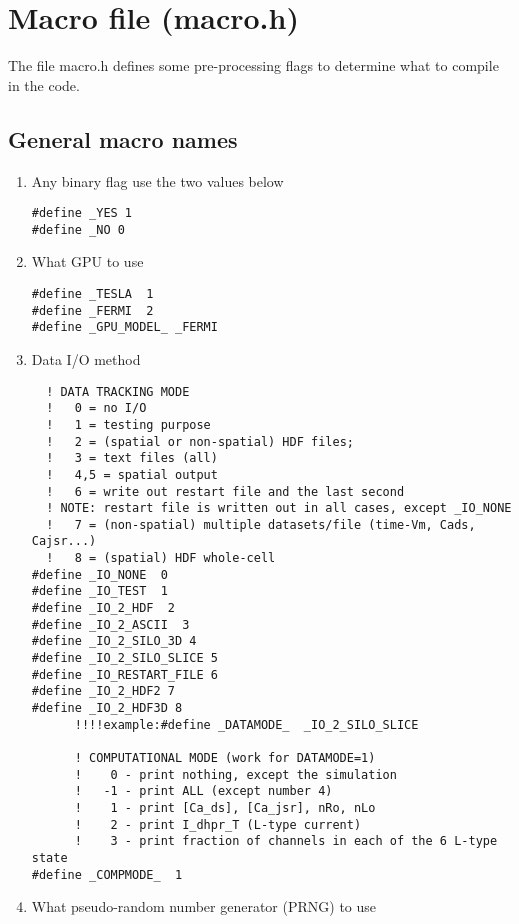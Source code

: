 \chapter{Macro file (macro.h)}

The file macro.h defines some pre-processing flags to determine what to compile
in the code. 

\section{General macro names}

\begin{enumerate}
  \item Any binary flag use the two values below

\begin{verbatim}
#define _YES 1
#define _NO 0 
\end{verbatim}

\item What GPU to use
\begin{verbatim}
#define _TESLA  1
#define _FERMI  2
#define _GPU_MODEL_ _FERMI
\end{verbatim}

\item Data I/O method
\begin{verbatim}
  ! DATA TRACKING MODE
  !   0 = no I/O
  !   1 = testing purpose
  !   2 = (spatial or non-spatial) HDF files;
  !   3 = text files (all)
  !   4,5 = spatial output
  !   6 = write out restart file and the last second
  ! NOTE: restart file is written out in all cases, except _IO_NONE
  !   7 = (non-spatial) multiple datasets/file (time-Vm, Cads, Cajsr...)
  !   8 = (spatial) HDF whole-cell
#define _IO_NONE  0
#define _IO_TEST  1
#define _IO_2_HDF  2
#define _IO_2_ASCII  3
#define _IO_2_SILO_3D 4 
#define _IO_2_SILO_SLICE 5
#define _IO_RESTART_FILE 6
#define _IO_2_HDF2 7
#define _IO_2_HDF3D 8      
      !!!!example:#define _DATAMODE_  _IO_2_SILO_SLICE
      
      ! COMPUTATIONAL MODE (work for DATAMODE=1)
      !    0 - print nothing, except the simulation
      !   -1 - print ALL (except number 4)
      !    1 - print [Ca_ds], [Ca_jsr], nRo, nLo
      !    2 - print I_dhpr_T (L-type current)
      !    3 - print fraction of channels in each of the 6 L-type state
#define _COMPMODE_  1
\end{verbatim}

\item What pseudo-random number generator (PRNG) to use
\begin{verbatim}


\end{verbatim}
\end{enumerate}
